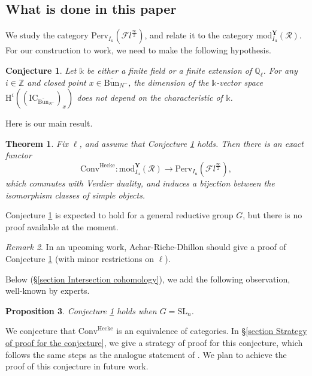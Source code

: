 \documentclass[11pt]{amsart}
\theoremstyle{plain}
\newtheorem{thm}{Theorem}[section]
\newtheorem{prop}[thm]{Proposition}
\newtheorem{conj}{Conjecture}[section]
\theoremstyle{remark}
\newtheorem{rem}[thm]{Remark}
\numberwithin{equation}{section}
\begin{document}
 \subsection{What is done in this paper} We study the category $\mathrm{Perv}_{I_\mathrm{u}}(\mathcal{F}l^{\frac{\infty}{2}})$, and relate it to the category $\mathrm{mod}^\mathbf{Y}_{I_\mathrm{u}}(\mathcal{R})$. For our construction to work, we need to make the following hypothesis.
 \begin{conj}\label{conj stalks}
Let $\mathbb{k}$ be either a finite field or a finite extension of $\mathbb{Q}_\ell$. For any $i\in\mathbb{Z}$ and closed point $x\in \overline{\mathrm{Bun}}_{N^-}$, the dimension of the $\mathbb{k}$-vector space $\mathrm{H}^i((\mathrm{IC}_{\overline{\mathrm{Bun}}_{N^-}})_x)$ does not depend on the characteristic of $\mathbb{k}$.
 \end{conj}
 Here is our main result.
 \begin{thm}
Fix $\ell$, and  assume that Conjecture \ref{conj stalks} holds. Then there is an exact functor
$$\mathrm{Conv}^{\mathrm{Hecke}}:\mathrm{mod}^\mathbf{Y}_{I_\mathrm{u}}(\mathcal{R})\to\mathrm{Perv}_{{I_\mathrm{u}}}(\mathcal{F}l^{\frac{\infty}{2}}), $$
which commutes with Verdier duality, and induces a bijection between the isomorphism classes of simple objects.
 \end{thm}
Conjecture \ref{conj stalks} is expected to hold for a general reductive group $G$, but there is no proof available at the moment.
\begin{rem}
    In an upcoming work, Achar-Riche-Dhillon should give a proof of Conjecture \ref{conj stalks} (with minor restrictions on $\ell$).
\end{rem}
Below (§\ref{section Intersection cohomology}), we add the 
 following observation, well-known by experts.
 \begin{prop}
     Conjecture \ref{conj stalks} holds when $G=\mathrm{SL}_n$.
 \end{prop}
 We conjecture that $\mathrm{Conv}^{\mathrm{Hecke}}$ is an equivalence of categories. In §\ref{section Strategy of proof for the conjecture}, we give a strategy of proof for this conjecture, which follows the same steps as the analogue statement of \cite{ABBGM}. We plan to achieve the proof of this conjecture in future work.
\end{document}
